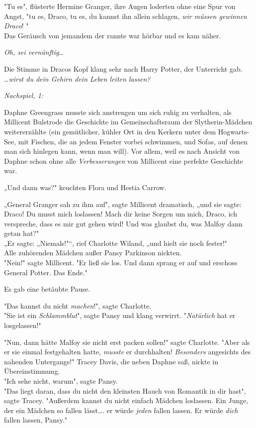 {"Tu es", flüsterte Hermine Granger, ihre Augen loderten ohne eine Spur von Angst, "tu es, Draco, tu es, du kannst ihn allein schlagen, \emph{wir müssen gewinnen Draco}! "\\ Das Geräusch von jemandem der rannte war hörbar und es kam näher.

\emph{Oh, sei vernünftig}…

Die Stimme in Dracos Kopf klang sehr nach Harry Potter, der Unterricht gab.\\ …\emph{wirst du dein Gehirn dein Leben leiten lassen?}

\emph{\emph{Nachspiel, 1:}}

Daphne Greengrass musste sich anstrengen um sich ruhig zu verhalten, als Millicent Bulstrode die Geschichte im Gemeinschaftsraum der Slytherin-Mädchen weitererzählte (ein gemütlicher, kühler Ort in den Kerkern unter dem Hogwarts-See, mit Fischen, die an jedem Fenster vorbei schwimmen, und Sofas, auf denen man sich hinlegen kann, wenn man will). Vor allem, weil es nach Ansicht von Daphne schon ohne alle \emph{Verbesserungen} von Millicent eine perfekte Geschichte war.

„Und dann was?" keuchten Flora und Hestia Carrow.

„General Granger sah zu ihm auf", sagte Millicent dramatisch, „und sie sagte: Draco! Du musst mich loslassen! Mach dir keine Sorgen um mich, Draco, ich verspreche, dass es mir gut gehen wird! Und was glaubst du, was Malfoy dann getan hat?"\\ „Er sagte: „Niemals!"“, rief Charlotte Wiland, „und hielt sie noch fester!"\\ Alle zuhörenden Mädchen außer Pansy Parkinson nickten.\\ "Nein!" sagte Millicent. "Er ließ sie los. Und dann sprang er auf und erschoss General Potter. Das Ende."

Es gab eine betäubte Pause.

"Das kannst du nicht \emph{machen}!", sagte Charlotte.\\ "Sie ist ein \emph{Schlammblut}", sagte Pansy und klang verwirrt. "\emph{Natürlich} hat er losgelassen!"

"Nun, dann hätte Malfoy sie nicht erst packen sollen!" sagte Charlotte. "Aber als er sie einmal festgehalten hatte, \emph{musste} er durchhalten! \emph{Besonders} angesichts des nahenden Untergangs!" Tracey Davis, die neben Daphne saß, nickte in Übereinstimmung.\\ "Ich sehe nicht, warum", sagte Pansy.\\ "Das liegt daran, dass du nicht den kleinsten Hauch von Romantik in dir hast", sagte Tracey. "Außerdem kannst du nicht einfach Mädchen loslassen. Ein Junge, der ein Mädchen so fallen lässt…. er würde \emph{jeden} fallen lassen. Er würde \emph{dich} fallen lassen, Pansy."

}
